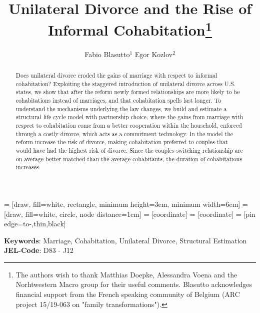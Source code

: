 \documentclass[12pt]{article}
\title{Unilateral Divorce and the Rise of Informal Cohabitation\thanks{The authors wish to thank Matthias Doepke, Alessandra Voena and the Norhtwestern Macro group for their useful comments. Blasutto acknowledges financial support from the French speaking community of Belgium (ARC project 15/19-063 on "family transformations").}}
\author{Fabio Blasutto$^1$ \quad Egor Kozlov$^2$}
\numberwithin{table}{section}
\begin{document}
	 	 = [draw, fill=white, rectangle, 
	minimum height=3em, minimum width=6em]
	 = [draw, fill=white, circle, node distance=1cm]
	 = [coordinate]
	 = [coordinate]
	 = [pin edge={to-,thin,black}]
	
	
	
	
	\maketitle

	
\begin{abstract}
	Does unilateral divorce eroded the gains of marriage with respect to informal cohabitation? Exploiting the staggered introduction of unilateral divorce across U.S. states, we show that after the reform newly formed relationships are more likely to be cohabitations instead of marriages, and that cohabitation spells last longer. To understand the mechanisms underlying the law changes, we build and estimate a structural life cycle model with partnership choice, where the gains from marriage with respect to cohabitation come from a better cooperation within the household, enforced through a costly divorce, which acts as a commitment technology. In the model the reform increase the risk of divorce, making cohabitation preferred to couples that would have had the highest risk of divorce. Since the couples switching relationship are on average better matched than the average cohabitants, the duration of cohabitations increases.
\end{abstract}
\textbf{Keywords}: Marriage, Cohabitation, Unilateral Divorce, Structural Estimation\\
\textbf{JEL-Code}: D83 - J12
\end{document}
